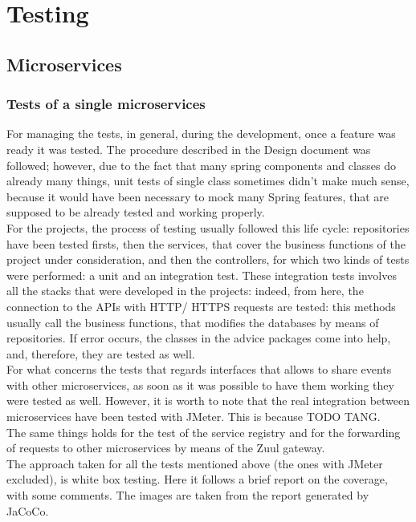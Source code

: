 \section{Testing}
\subsection{Microservices}
\subsubsection{Tests of a single microservices}
For managing the tests, in general, during the development, once a feature was ready it was tested. 
The procedure described in the Design document was followed; however, due to the fact that many spring
components and classes do already many things, unit tests of single class sometimes didn't make much 
sense, because it would have been necessary to mock many Spring features, that are supposed to be already
tested and working properly. \\
For the projects, the process of testing usually followed this life cycle: repositories have been tested firsts, then the services, that cover
the business functions of the project under consideration, and then the controllers, for which two kinds of tests were performed: a unit and
an integration test.
These integration tests involves all the stacks that were developed in the projects: indeed, from here, the connection to the APIs with HTTP/
HTTPS requests are tested: this methods usually call the business functions, that modifies the databases by means of repositories.
If error occurs, the classes in the advice packages come into help, and, therefore, they are tested as well. \\
For what concerns the tests that regards interfaces that allows to share events with other microservices, as soon as it was possible to have
them working they were tested as well. 
However, it is worth to note that the real integration between microservices have been tested with JMeter. This is because TODO TANG. \\
The same things holds for the test of the service registry and for the forwarding of requests to other microservices by means of the Zuul
gateway.  \\
The approach taken for all the tests mentioned above (the ones with JMeter excluded), is white box testing. 
Here it follows a brief report on the coverage, with some comments. The images are taken
from the report generated by JaCoCo. \\

